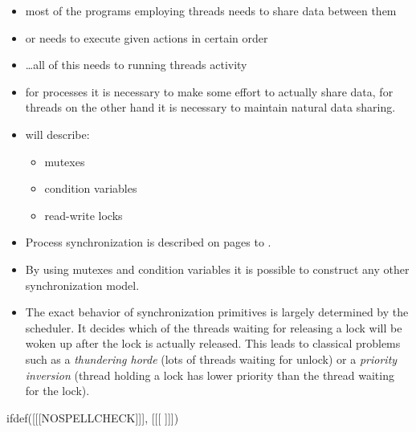
\begin{slide}

\begin{itemize}
\item most of the programs employing threads needs to share data between them
\item or needs to execute given actions in certain order
\item \dots{}all of this needs to  running threads activity
\item for processes it is necessary to make some effort to actually share data,
for threads on the other hand it is necessary to maintain natural data sharing.
\item will describe:
\begin{itemize}
\item mutexes
\item condition variables
\item read-write locks
\end{itemize}
\end{itemize}
\end{slide}

\label{THREADSYNCHRONIZATION}

\begin{itemize}
\item Process synchronization is described on pages
\pageref{SYNCHRONIZATION} to \pageref{SYNCHRONIZATIONEND}.
\item By using mutexes and condition variables it is possible to construct any
other synchronization model.
\item The exact behavior of synchronization primitives is largely determined by
the scheduler.  It decides which of the threads waiting for releasing a lock
will be woken up after the lock is actually released. This leads to classical
problems such as a \emph{thundering horde} (lots of threads waiting for unlock)
or a \emph{priority inversion} (thread holding a lock has lower priority than
the thread waiting for the lock).
\end{itemize}


ifdef([[[NOSPELLCHECK]]], [[[
]]])

